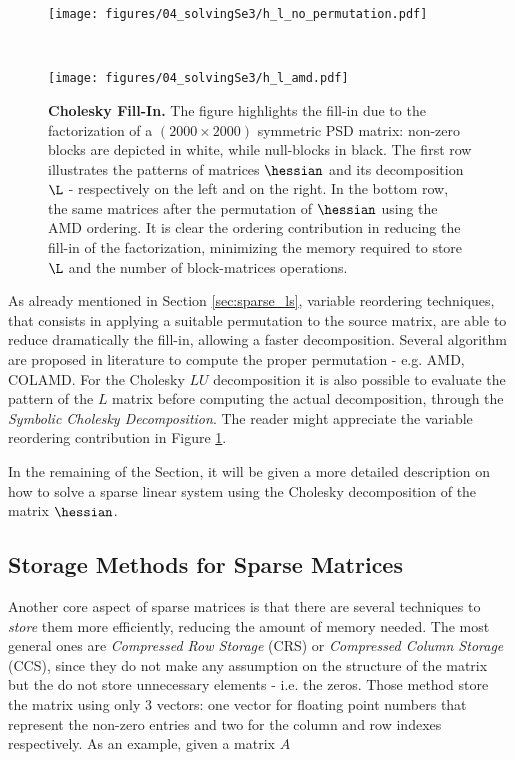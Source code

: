 \begin{figure}[!hbt]
    \centering
    \begin{minipage}[t!]{\textwidth}
        \centering
        \texttt{[image: figures/04\_solvingSe3/h\_l\_no\_permutation.pdf]}
        \label{fig:cholesky_fill_in_no_odering}
    \end{minipage}\\
    \begin{minipage}[t!]{\textwidth}
        \centering
        \texttt{[image: figures/04\_solvingSe3/h\_l\_amd.pdf]}
        \label{fig:cholesky_fill_in_amd}
    \end{minipage}%
    \caption{\textbf{Cholesky Fill-In.} The figure highlights the fill-in due to the factorization of a $(2000\times2000)$ symmetric PSD matrix: non-zero blocks are depicted in white, while null-blocks in black. The first row illustrates the patterns of matrices $\hessian$ and its decomposition $\L$ - respectively on the left and on the right. In the bottom row, the same matrices after the permutation of $\hessian$ using the AMD ordering. It is clear the ordering contribution in reducing the fill-in of the factorization, minimizing the memory required to store $\L$ and the number of block-matrices operations.} 
    \label{fig:cholesky_fill_in}
\end{figure}

As already mentioned in Section \ref{sec:sparse_ls}, variable reordering techniques, that consists in applying a suitable permutation to the source matrix, are able to reduce dramatically the fill-in, allowing a faster decomposition. Several algorithm are proposed in literature to compute the proper permutation - e.g. AMD, COLAMD. For the Cholesky $LU$ decomposition it is also possible to evaluate the pattern of the $L$ matrix before computing the actual decomposition, through the \textit{Symbolic Cholesky Decomposition}. The reader might appreciate the variable reordering contribution in Figure \ref{fig:cholesky_fill_in}.

In the remaining of the Section, it will be given a more detailed description on how to solve a sparse linear system using the Cholesky decomposition of the matrix $\hessian$.

\subsection{Storage Methods for Sparse Matrices}\label{subsec:sparse_storage_methods}
Another core aspect of sparse matrices is that there are several techniques to \textit{store} them more efficiently, reducing the amount of memory needed. The most general ones are \textit{Compressed Row Storage} (CRS) or \textit{Compressed Column Storage} (CCS), since they do not make any assumption on the structure of the matrix but the do not store unnecessary elements - i.e. the zeros. Those method store the matrix using only 3 vectors: one vector for floating point numbers that represent the non-zero entries and two for the column and row indexes respectively. As an example, given a matrix $A$

